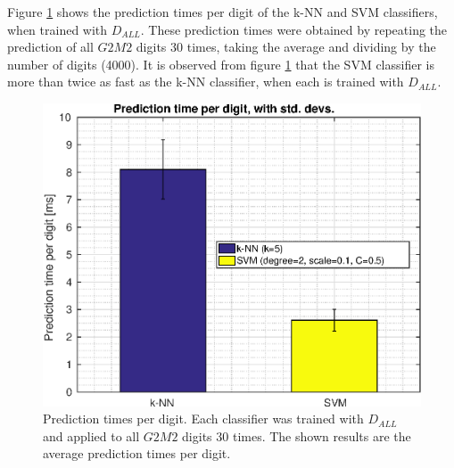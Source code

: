 Figure \ref{fig:prediction-times} shows the prediction times per digit
of the k-NN and SVM classifiers, when trained with \(D_{ALL}\).
These prediction times were obtained by repeating the prediction
of all \(G2M2\) digits 30 times, taking the average and dividing by the number
of digits (4000).
It is observed from figure \ref{fig:prediction-times} that
the SVM classifier is more than twice as fast as the k-NN classifier,
when each is trained with \(D_{ALL}\).
\begin{figure}[h]
\centering
\includegraphics[width=\figscale]{img/prediction-times}
\caption[Prediction times per digit]
{
Prediction times per digit. Each classifier was trained with \(D_{ALL}\)
and applied to all \(G2M2\) digits 30 times.
The shown results are the average prediction times per digit.
}
\label{fig:prediction-times}
\end{figure}
